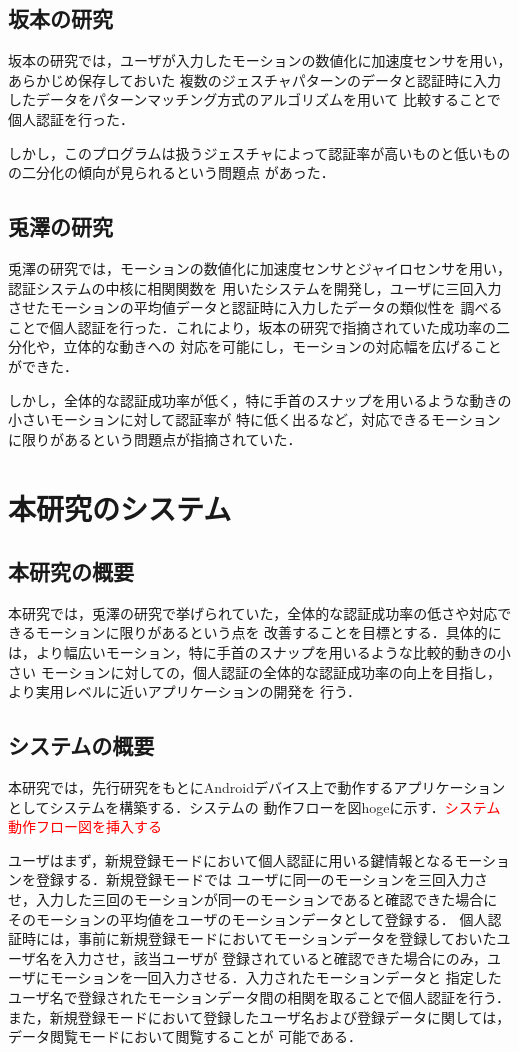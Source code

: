 \documentclass[11pt]{jreport}
\begin{document}
	\section{坂本の研究}
	坂本の研究では，ユーザが入力したモーションの数値化に加速度センサを用い，あらかじめ保存しておいた
    複数のジェスチャパターンのデータと認証時に入力したデータをパターンマッチング方式のアルゴリズムを用いて
    比較することで個人認証を行った．

    しかし，このプログラムは扱うジェスチャによって認証率が高いものと低いものの二分化の傾向が見られるという問題点
    があった．
	\section{兎澤の研究}
    兎澤の研究では，モーションの数値化に加速度センサとジャイロセンサを用い，認証システムの中核に相関関数を
    用いたシステムを開発し，ユーザに三回入力させたモーションの平均値データと認証時に入力したデータの類似性を
    調べることで個人認証を行った．これにより，坂本の研究で指摘されていた成功率の二分化や，立体的な動きへの
    対応を可能にし，モーションの対応幅を広げることができた．

    しかし，全体的な認証成功率が低く，特に手首のスナップを用いるような動きの小さいモーションに対して認証率が
    特に低く出るなど，対応できるモーションに限りがあるという問題点が指摘されていた．

\chapter{本研究のシステム}
	\section{本研究の概要}
	本研究では，兎澤の研究で挙げられていた，全体的な認証成功率の低さや対応できるモーションに限りがあるという点を
    改善することを目標とする．具体的には，より幅広いモーション，特に手首のスナップを用いるような比較的動きの小さい
    モーションに対しての，個人認証の全体的な認証成功率の向上を目指し，より実用レベルに近いアプリケーションの開発を
    行う．
	\section{システムの概要}
	本研究では，先行研究をもとにAndroidデバイス上で動作するアプリケーションとしてシステムを構築する．システムの
    動作フローを図hogeに示す．\textcolor{red}{システム動作フロー図を挿入する}

    ユーザはまず，新規登録モードにおいて個人認証に用いる鍵情報となるモーションを登録する．新規登録モードでは
    ユーザに同一のモーションを三回入力させ，入力した三回のモーションが同一のモーションであると確認できた場合に
    そのモーションの平均値をユーザのモーションデータとして登録する．
    個人認証時には，事前に新規登録モードにおいてモーションデータを登録しておいたユーザ名を入力させ，該当ユーザが
    登録されていると確認できた場合にのみ，ユーザにモーションを一回入力させる．入力されたモーションデータと
    指定したユーザ名で登録されたモーションデータ間の相関を取ることで個人認証を行う．
    また，新規登録モードにおいて登録したユーザ名および登録データに関しては，データ閲覧モードにおいて閲覧することが
    可能である．
\end{document}
